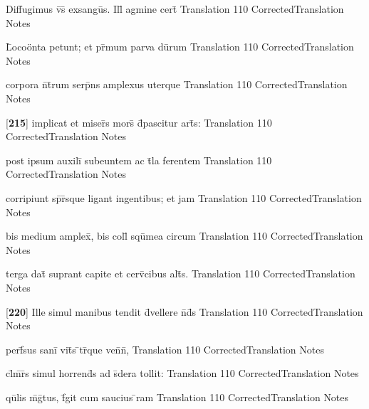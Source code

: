 \latline
  {Diffugimus v\={\macron {\i}}s\={} exsangu\={}s.  Ill\={\macron {\i}} agmine cert\={}}
  { Translation }
  {110}
  { CorrectedTranslation }
  { Notes }


\latline
  {L\={}oco\"{o}nta petunt; et pr\={\macron {\i}}mum parva du\={}rum}
  { Translation }
  {110}
  { CorrectedTranslation }
  { Notes }


\latline
  {corpora n\={}t\={}rum serp\={}ns amplexus uterque}
  { Translation }
  {110}
  { CorrectedTranslation }
  { Notes }


\latline
  {[\textbf{215}] implicat et miser\={}s mors\={} d\={}pascitur art\={}s:}
  { Translation }
  {110}
  { CorrectedTranslation }
  { Notes }


\latline
  {post ipsum auxili\={} subeuntem ac t\={}la ferentem}
  { Translation }
  {110}
  { CorrectedTranslation }
  { Notes }


\latline
  {corripiunt sp\={\macron {\i}}r\={\macron {\i}}sque ligant ingentibus; et jam}
  { Translation }
  {110}
  { CorrectedTranslation }
  { Notes }


\latline
  {bis medium amplex\={\macron {\i}}, bis coll\={} squ\={}mea circum}
  { Translation }
  {110}
  { CorrectedTranslation }
  { Notes }


\latline
  {terga dat\={\macron {\i}} suprant capite et cerv\={\macron {\i}}cibus alt\={\macron {\i}}s.}
  { Translation }
  {110}
  { CorrectedTranslation }
  { Notes }


\latline
  {[\textbf{220}] Ille simul manibus tendit d\={\macron {\i}}vellere n\={}d\={}s}
  { Translation }
  {110}
  { CorrectedTranslation }
  { Notes }


\latline
  {perf\={}sus sani\={} vit\={}s \={}tr\={}que ven\={}n\={},}
  { Translation }
  {110}
  { CorrectedTranslation }
  { Notes }


\latline
  {cl\={}m\={}r\={}s simul horrend\={}s ad s\={\macron {\i}}dera tollit:}
  { Translation }
  {110}
  { CorrectedTranslation }
  { Notes }


\latline
  {qu\={}lis m\={}g\={\macron {\i}}tus, f\={}git cum saucius \={}ram}
  { Translation }
  {110}
  { CorrectedTranslation }
  { Notes }


